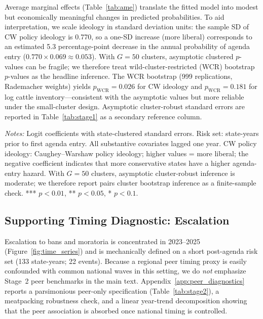 \documentclass[12pt]{article}
\begin{document}
Average marginal effects (Table~\ref{tab:ame}) translate the fitted model into modest but economically meaningful changes in predicted probabilities.  To aid interpretation, we scale ideology in standard deviation units: the sample SD of CW policy ideology is 0.770, so a one-SD increase (more liberal) corresponds to an estimated 5.3 percentage-point decrease in the annual probability of agenda entry (\(0.770\times 0.069 \approx 0.053\)).  With $G = 50$ clusters, asymptotic clustered $p$-values can be fragile; we therefore treat wild-cluster-restricted (WCR) bootstrap $p$-values \citep{cameron2008bootstrap} as the headline inference.  The WCR bootstrap (999 replications, Rademacher weights) yields $p_{\text{WCR}} = 0.026$ for CW ideology and $p_{\text{WCR}} = 0.181$ for log cattle inventory---consistent with the asymptotic values but more reliable under the small-cluster design.  Asymptotic cluster-robust standard errors are reported in Table~\ref{tab:stage1} as a secondary reference column.

\begin{table}[htbp]
\centering
\begin{threeparttable}
\caption{Stage 1: Discrete-Time Hazard of Agenda Entry (Parsimonious vs.\ Extended)}
\label{tab:stage1}

\begin{tablenotes}[flushleft]
\footnotesize
\item \textit{Notes:} Logit coefficients with state-clustered standard errors. Risk set: state-years prior to first agenda entry.  All substantive covariates lagged one year.  CW policy ideology: Caughey--Warshaw policy ideology; higher values = more liberal; the negative coefficient indicates that more conservative states have a higher agenda-entry hazard.  With $G=50$ clusters, asymptotic cluster-robust inference is moderate; we therefore report pairs cluster bootstrap inference as a finite-sample check.  *** $p<0.01$, ** $p<0.05$, * $p<0.1$.
\end{tablenotes}
\end{threeparttable}
\end{table}

\subsection{Supporting Timing Diagnostic: Escalation}

Escalation to bans and moratoria is concentrated in 2023--2025 (Figure~\ref{fig:time_series}) and is mechanically defined on a short post-agenda risk set (133 state-years; 22 events).  Because a regional peer timing proxy is easily confounded with common national waves in this setting, we do \emph{not} emphasize Stage~2 peer benchmarks in the main text.  Appendix~\ref{app:peer_diagnostics} reports a parsimonious peer-only specification (Table~\ref{tab:stage2}), a meatpacking robustness check, and a linear year-trend decomposition showing that the peer association is absorbed once national timing is controlled.
\end{document}
